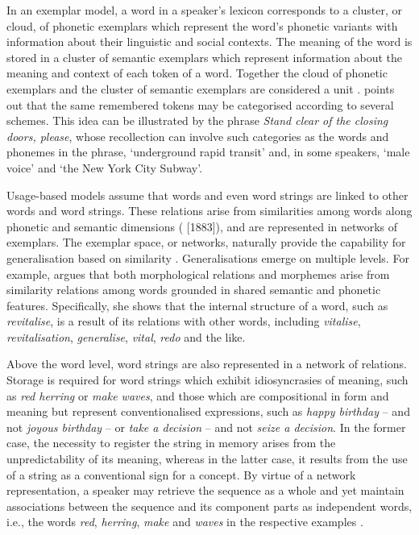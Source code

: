 In an exemplar model, a word in a speaker's lexicon corresponds to a cluster, or cloud, of phonetic exemplars which represent the word's phonetic variants with information about their linguistic and social contexts. The meaning of the word is stored in a cluster of semantic exemplars which represent information about the meaning and context of each token of a word. Together the cloud of phonetic exemplars and the cluster of semantic exemplars are considered a unit \citep[for an overview and further details, see][]{bybee-beckner-2009, bybee-book-2010}. \citet{pierrehumbert-2001} points out that the same remembered tokens may be categorised according to several schemes. This idea can be illustrated by the phrase \textit{Stand clear of the closing doors, please}, whose recollection can involve such categories as the words and phonemes in the phrase, `underground rapid transit' and, in some speakers, `male voice' and `the New York City Subway'.

Usage-based models assume that words and even word strings are linked to other words and word strings. These relations arise from similarities among words along phonetic and semantic dimensions (\citealt[101]{kruszewski} [1883]), and are represented in networks of exemplars. The exemplar space, or networks, naturally provide the capability for generalisation based on similarity \citep[cf.][]{pierrehumbert-2002}. Generalisations emerge on multiple levels. For example, \citet{bybee-morphology-1985, bybee-book-2010, bybee-word-2002} argues that both morphological relations and morphemes arise from similarity relations among words grounded in shared semantic and phonetic features. Specifically, she shows that the internal structure of a word, such as \textit{revitalise}, is a result of its relations with other words, including \textit{vitalise}, \textit{revitalisation}, \textit{generalise}, \textit{vital}, \textit{redo} and the like. 

Above the word level, word strings are also represented in a network of relations. Storage is required for word strings which exhibit idiosyncrasies of meaning, such as \textit{red herring} or \textit{make waves}, and those which are compositional in form and meaning but represent conventionalised expressions, such as \textit{happy birthday} -- and not \textit{joyous birthday} -- or \textit{take a decision} -- and not \textit{seize a decision}. In the former case, the necessity to register the string in memory arises from the unpredictability of its meaning, whereas in the latter case, it results from the use of a string as a conventional sign for a concept. By virtue of a network representation, a speaker may retrieve the sequence as a whole and yet maintain associations between the sequence and its component parts as independent words, i.e., the words \textit{red}, \textit{herring}, \textit{make} and \textit{waves} in the respective examples \citep[cf.][25]{bybee-book-2010}. 

